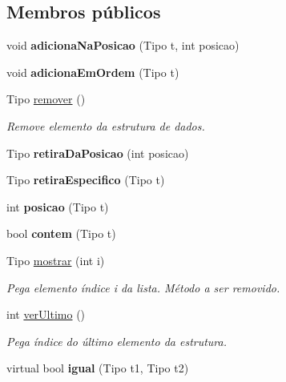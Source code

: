 \subsection*{Membros públicos}
\begin{DoxyCompactItemize}
\item 
\hypertarget{classLista_a21853f382bab3540ab6dfeece9fe3ba1}{void {\bfseries adiciona\-Na\-Posicao} (Tipo t, int posicao)}\label{classLista_a21853f382bab3540ab6dfeece9fe3ba1}

\item 
\hypertarget{classLista_a9c9a9ac8cbf7e849b2e470c3be5926a2}{void {\bfseries adiciona\-Em\-Ordem} (Tipo t)}\label{classLista_a9c9a9ac8cbf7e849b2e470c3be5926a2}

\item 
Tipo \hyperlink{classLista_a58768c31b7137a2303212b63e9804dc6}{remover} ()
\begin{DoxyCompactList}\small\item\em Remove elemento da estrutura de dados. \end{DoxyCompactList}\item 
\hypertarget{classLista_a554cfbab02c678a9186ffb3d80079e97}{Tipo {\bfseries retira\-Da\-Posicao} (int posicao)}\label{classLista_a554cfbab02c678a9186ffb3d80079e97}

\item 
\hypertarget{classLista_aff23d54db73f06e457eba73b886fd84f}{Tipo {\bfseries retira\-Especifico} (Tipo t)}\label{classLista_aff23d54db73f06e457eba73b886fd84f}

\item 
\hypertarget{classLista_ad374d77a408c513004c79cd33ddc76a3}{int {\bfseries posicao} (Tipo t)}\label{classLista_ad374d77a408c513004c79cd33ddc76a3}

\item 
\hypertarget{classLista_a3dcad88a266c9d487e149c366f7e8d05}{bool {\bfseries contem} (Tipo t)}\label{classLista_a3dcad88a266c9d487e149c366f7e8d05}

\item 
Tipo \hyperlink{classLista_a3f5160b0b143e8ccff2b0e01fa21dc76}{mostrar} (int i)
\begin{DoxyCompactList}\small\item\em Pega elemento índice i da lista. Método a ser removido. \end{DoxyCompactList}\item 
int \hyperlink{classLista_a14d6e9acad66f7b7c8630dbe2372057a}{ver\-Ultimo} ()
\begin{DoxyCompactList}\small\item\em Pega índice do último elemento da estrutura. \end{DoxyCompactList}\item 
\hypertarget{classLista_a57d2a6b4d7f47e29f9a3993190a193e5}{virtual bool {\bfseries igual} (Tipo t1, Tipo t2)}\label{classLista_a57d2a6b4d7f47e29f9a3993190a193e5}


\end{DoxyCompactItemize}
